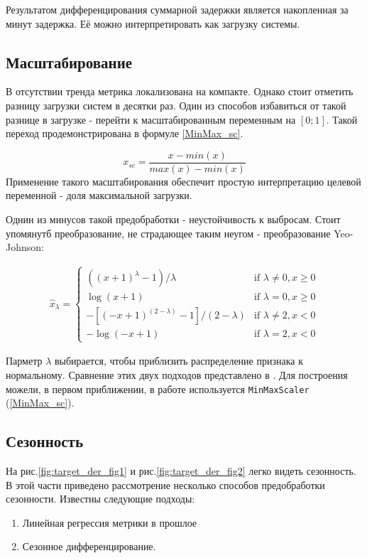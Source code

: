 \documentclass[14pt, a4paper]{extarticle}
\renewcommand{\geq}{\geqslant}
\begin{document}
	Результатом дифференцирования суммарной задержки является накопленная за минут задержка. Её можно интерпретировать как загрузку системы.
	
	\subsection{Масштабирование}
	В отсутствии тренда метрика локализована на компакте. Однако стоит отметить разницу загрузки систем в десятки раз.	
	Один из способов избавиться от такой разнице в загрузке - перейти к масштабированным переменным на $[0;1]$. Такой переход продемонстрирована в формуле \ref{MinMax_sc}.
	
	\begin{equation}
		x_{sc} = \frac{x - min(x)}{max(x) - min(x)} \label{MinMax_sc}
	\end{equation}
	Применение такого масштабирования обеспечит простую интерпретацию целевой переменной - доля максимальной загрузки.
	
	Однин из минусов такой предобработки - неустойчивость к выбросам.
	Стоит упомянутб преобразование, не страдающее таким неугом - преобразование Yeo-Johnson:
	
	\begin{align}
	\hat{x}_{\lambda} = 
	\begin{cases}
	((x+1)^{\lambda }-1)/\lambda &{\text{if }}\lambda \neq 0,x\geq 0\\
	\log(x+1)&{\text{if }}\lambda =0,x\geq 0\\
	-[(-x+1)^{(2-\lambda )}-1]/(2-\lambda )&{\text{if }}\lambda \neq 2,x<0\\
	-\log(-x+1)&{\text{if }}\lambda =2,x<0
	\end{cases} \label{Yeo-Joh}
	\end{align}
	
	Парметр $\lambda$ выбирается, чтобы приблизить распределение признака к нормальному.
	Сравнение этих двух подходов представлено в \cite{lib_sklearn_transformer_outliers}.
	Для построения можели, в первом приближении, в работе используется \texttt{MinMaxScaler} (\ref{MinMax_sc}).
	
	
	
	\subsection{Сезонность}
	На рис.\ref{fig:target_der_fig1} и рис.\ref{fig:target_der_fig2} легко видеть сезонность.
	В этой части приведено рассмотрение несколько способов предобработки сезонности. Известны следующие подходы:
	\begin{enumerate}
		\item Линейная регрессия метрики в прошлое 
		\item Сезонное дифференцирование.
	\end{enumerate}
\end{document}
